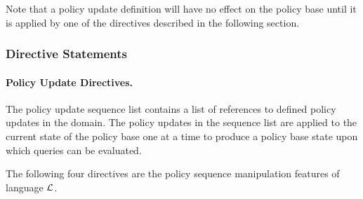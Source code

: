 \documentclass[global,twocolumn,draft]{svjour}
\begin{document}
          Note that a policy update definition will have no effect on the
          policy base until it is applied by one of the directives described in
          the following section.

        \subsubsection{Directive Statements}

        \paragraph{Policy Update Directives.}

        The policy update sequence list contains a list of references to
        defined policy updates in the domain. The policy updates in the
        sequence list are applied to the current state of the policy base one
        at a time to produce a policy base state upon which queries can be
        evaluated.

        The following four directives are the policy sequence manipulation
        features of language $\cal{L}$.
\end{document}
